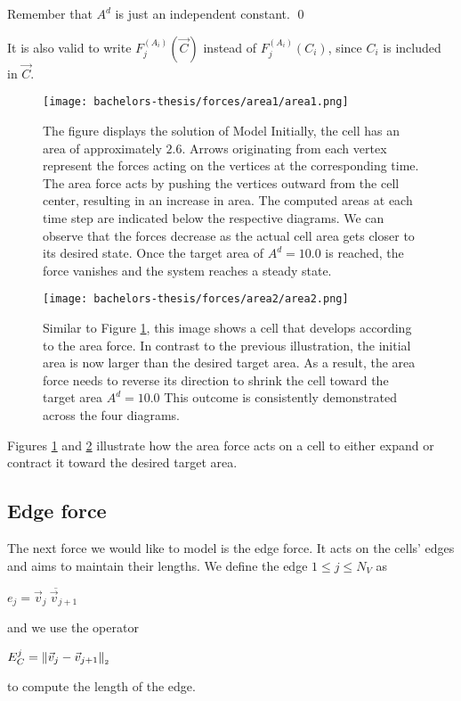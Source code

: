 \begin{proposition}
	Remember that $A^d$ is just an independent constant. 
	\qed
\end{proposition}
It is also valid to write $F_{j}^{(A_i)}(\vec{C})$ instead of $F_{j}^{(A_i)}(C_i)$, since $C_i$ is included in $\vec{C}$. 


\begin{figure}
	\begin{center}
		\texttt{[image: bachelors-thesis/forces/area1/area1.png]}
		\caption{The figure displays the solution of Model  
		Initially, the cell has an area of approximately $2.6$. 
		Arrows originating from each vertex represent the forces acting on the vertices at the corresponding time.
		The area force acts by pushing the vertices outward from the cell center, resulting in an increase in area.
		The computed areas at each time step are indicated below the respective diagrams.
		We can observe that the forces decrease as the actual cell area gets closer to its desired state. 
		Once the target area of $A^d = 10.0$ is reached, the force vanishes and the system reaches a steady state.
		}
		\label{fig:areaForce}
	\end{center}
\end{figure}

\begin{figure}
	\begin{center}
		\texttt{[image: bachelors-thesis/forces/area2/area2.png]}
		\caption{Similar to Figure \ref{fig:areaForce}, this image shows a cell that develops according to the area force. 
		In contrast to the previous illustration, the initial area is now larger than the desired target area.
		As a result, the area force needs to reverse its direction to shrink the cell toward the target area $A^d = 10.0$
		This outcome is consistently demonstrated across the four diagrams. }
		\label{fig:areaForce2}
	\end{center}
\end{figure}

Figures \ref{fig:areaForce} and \ref{fig:areaForce2} illustrate how the area force acts on a cell to either expand or contract it toward the desired target area.

    
\subsection{Edge force}
The next force we would like to model is the edge force. 
It acts on the cells' edges and aims to maintain their lengths.
We define the edge $1 \leq j \leq N_V$ as 
\begin{center}
	$
	e_j = \overline{\vec{v}_j \: \vec{v}_{j+1}}
	$
\end{center}
and we use the operator 
\begin{center}
	$
	E^j_C = \norm[\vec{v}_j - \vec{v}_{j+1}]
	$
\end{center}
to compute the length of the edge. 

